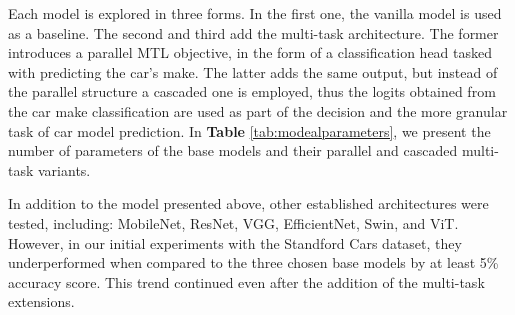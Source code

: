 \documentclass[conference]{IEEEtran}
\begin{document}
Each model is explored in three forms. In the first one, the vanilla model is used as a baseline. The second and third add the multi-task architecture. The former introduces a parallel MTL objective, in the form of a classification head tasked with predicting the car's make. The latter adds the same output, but instead of the parallel structure a cascaded one is employed, thus the logits obtained from the car make classification are used as part of the decision and the more granular task of car model prediction. In \textbf{Table} \ref{tab:modealparameters}, we present the number of parameters of the base models and their parallel and cascaded multi-task variants.

\begin{table}[ht]
    \centering
    \scriptsize
    \caption{Number of parameters for each base and multi-task model.}
    \label{tab:modealparameters}
\end{table}

In addition to the model presented above, other established architectures were tested, including: MobileNet, ResNet, VGG, EfficientNet, Swin, and ViT. However, in our initial experiments with the Standford Cars dataset, they underperformed when compared to the three chosen base models by at least 5\% accuracy score. This trend continued even after the addition of the multi-task extensions. 
\end{document}
